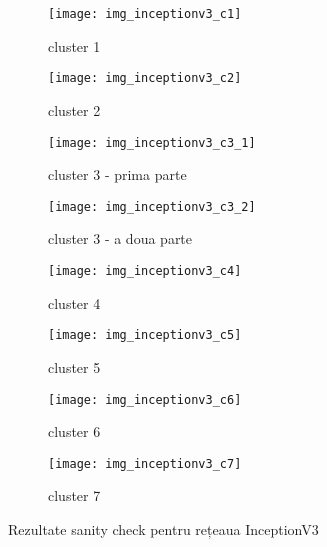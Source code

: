 \begin{figure}[!h]
  \centering
  \begin{subfigure}[t]{0.45\textwidth}
    \caption{cluster 1}
    \texttt{[image: img\_inceptionv3\_c1]}
  \end{subfigure}
  \hfill
  \begin{subfigure}[t]{0.45\textwidth}
    \caption{cluster 2}
    \texttt{[image: img\_inceptionv3\_c2]}
  \end{subfigure}
   \hfill
  \begin{subfigure}[t]{0.45\textwidth}
    \caption{cluster 3 - prima parte}
    \texttt{[image: img\_inceptionv3\_c3\_1]}
  \end{subfigure}
  \hfill
  \begin{subfigure}[t]{0.45\textwidth}
    \caption{cluster 3 - a doua parte}
    \texttt{[image: img\_inceptionv3\_c3\_2]}
  \end{subfigure}
  \hfill
  \begin{subfigure}[t]{0.45\textwidth}
    \caption{cluster 4}
    \texttt{[image: img\_inceptionv3\_c4]}
  \end{subfigure}
  \hfill
  \begin{subfigure}[t]{0.45\textwidth}
    \caption{cluster 5}
    \texttt{[image: img\_inceptionv3\_c5]}
  \end{subfigure}
  \hfill
  \begin{subfigure}[t]{0.45\textwidth}
    \caption{cluster 6}
    \texttt{[image: img\_inceptionv3\_c6]}
  \end{subfigure}
    \hfill
  \begin{subfigure}[t]{0.45\textwidth}
    \caption{cluster 7}
    \texttt{[image: img\_inceptionv3\_c7]}
  \end{subfigure}
  \caption[Rezultate sanity check pentru rețeaua InceptionV3]{Rezultate sanity check pentru rețeaua InceptionV3}
\end{figure}

